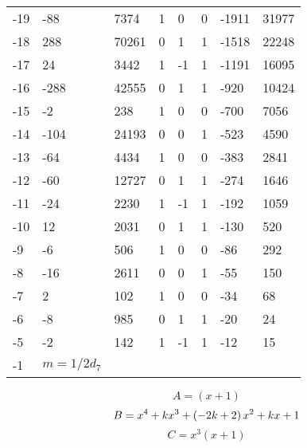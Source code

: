 \documentclass{amsart}
\begin{document}
\begin{longtable}{|l|l|l|lllll|}
-19&-88&7374&1&0&0&-1911&31977\\
-18&288&70261&0&1&1&-1518&22248\\
-17&24&3442&1&-1&1&-1191&16095\\
-16&-288&42555&0&1&1&-920&10424\\
-15&-2&238&1&0&0&-700&7056\\
-14&-104&24193&0&0&1&-523&4590\\
-13&-64&4434&1&0&0&-383&2841\\
-12&-60&12727&0&1&1&-274&1646\\
-11&-24&2230&1&-1&1&-192&1059\\
-10&12&2031&0&1&1&-130&520\\
-9&-6&506&1&0&0&-86&292\\
-8&-16&2611&0&0&1&-55&150\\
-7&2&102&1&0&0&-34&68\\
-6&-8&985&0&1&1&-20&24\\
-5&-2&142&1&-1&1&-12&15\\
-1&$m=1/2d_{7}$&&\multicolumn{5}{c|}{}\\
\hline
\end{longtable}
$$A=(x
 + 1)$$
$$B=x^4
 + k\*x^3
 + \left(-2\*k
 + 2\right) \*x^2
 + k\*x
 + 1$$
$$C=x^3(x
 + 1)$$
\end{document}
